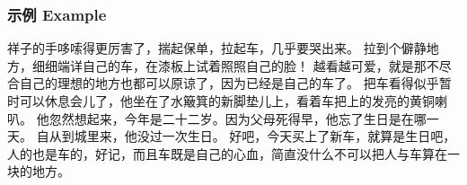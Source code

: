 \documentclass[a4paper]{article}
\begin{document}
    \subsubsection{示例 Example}
        祥子的手哆嗦得更厉害了，揣起保单，拉起车，几乎要哭出来。
        拉到个僻静地方，细细端详自己的车，\cite{laoshe}在漆板上试着照照自己的脸！
        越看越可爱，就是那不尽合自己的理想的地方也都可以原谅了，因为已经是自己的车了。
        把车看得似乎暂时可以休息会儿了，他坐在了水簸箕的新脚垫儿上，看着车把上的发亮的黄铜喇叭。
        他忽然想起来，今年是二十二岁\cite{einstein}。因为父母死得早，他忘了生日是在哪一天。
        自从到城里来，他没过一次生日。
        好吧，今天买上了新车，就算是生日\cite{knuthwebsite}吧，人的也是车的，好记，而且车既是自己的心血，简直没什么不可以把人与车算在一块的地方。

\newpage


\end{document}
